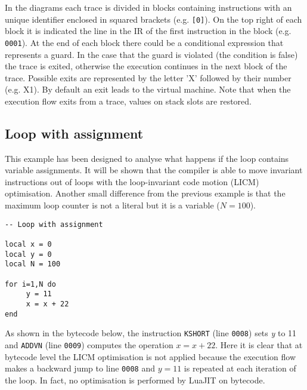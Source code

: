 \noindent
\begin{comment}
Explaining the IR in details would be to complex and tedious for the reader. Thus, from this example forward there will be a diagram that explains the execution  flows.  
\end{comment}
In the diagrams each trace is divided in blocks containing instructions with an unique identifier enclosed in squared brackets (e.g. \texttt{[0]}). On the top right of each block it is indicated the line in the IR of the first instruction in the block (e.g. \texttt{0001}). At the end of each block there could be a conditional expression that represents a guard. In the case that the guard is violated (the condition is false) the trace is exited, otherwise the execution continues in the next block of the trace. Possible exits are represented by the letter 'X' followed by their number (e.g. X1). By default an exit leads to the virtual machine. Note that when the execution flow exits from a trace, values on stack slots are restored.

\subsection{Loop with assignment}
This example has been designed to analyse what happens if the loop contains variable assignments. It will be shown that the compiler is able to move invariant instructions out of loops \cite{lj-mail-understand-ir} with the loop-invariant code motion (LICM) optimisation. Another small difference from the previous example is that the maximum loop counter is not a literal but it is a variable ($N=100$). 
\begin{mdframed}[style=LuaStyleFrame]
\begin{lstlisting}[style=LuaStyle]
-- Loop with assignment

local x = 0
local y = 0
local N = 100

for i=1,N do
	 y = 11
	 x = x + 22
end
\end{lstlisting}
\end{mdframed}

\noindent
As shown in the bytecode below, the instruction \texttt{KSHORT} (line \texttt{0008}) sets \textit{y} to 11 and \texttt{ADDVN} (line \texttt{0009}) computes the operation $x=x+22$. Here it is clear that at bytecode level the LICM optimisation is not applied because the execution flow makes a backward jump to line \texttt{0008} and $y=11$ is repeated at each iteration of the loop. In fact, no optimisation is performed by LuaJIT on bytecode.

